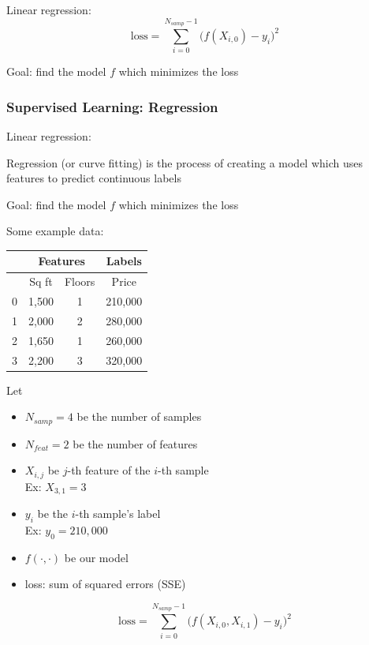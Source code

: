 \documentclass{beamer}
\begin{document}
\begin{frame}
\begin{alertblock}{Linear regression:}
			\begin{equation*}
				\textrm{loss} = \sum_{i=0}^{N_{samp}-1} \Big( f(X_{i,0}) - y_i \Big)^2
			\end{equation*}
			
			\vspace{10pt}
			Goal: find the model $f$ which minimizes the loss
		\endminipage\hfill
	\end{alertblock}

\end{frame}

\begin{frame}
	\frametitle{Supervised Learning: Regression}
	
	\begin{alertblock}{Linear regression:}
		\footnotesize
		
			Regression (or curve fitting) is the process of creating a model which uses features to predict continuous labels
		
			\vspace{10pt}
			Goal: find the model $f$ which minimizes the loss
			
			\vspace{10pt}
			Some example data: \\
			
			\begin{tabular}{|c|c|c|c|}
				\hline
				& \multicolumn{2}{|c|}{Features} & Labels \\
				\hline
				& Sq ft & Floors & Price \\
				\hline
				0 & 1,500 & 1 & 210,000 \\
				\hline
				1 & 2,000 & 2 & 280,000 \\
				\hline
				2 & 1,650 & 1 & 260,000 \\
				\hline
				3 & 2,200 & 3 & 320,000 \\
				\hline
			\end{tabular}
		\endminipage\hfill
		\endminipage\hfill
			Let
			\begin{itemize}
				\item $N_{samp}=4$ be the number of samples
				\item $N_{feat}=2$ be the number of features
				\item $X_{i,j}$ be $j$-th feature of the $i$-th sample \\
				Ex: $X_{3,1} = 3$
				\item $y_i$ be the $i$-th sample's label \\
				Ex: $y_{0} = 210,000$
				\item $f(\cdot,\cdot)$ be our model
				\item loss: sum of squared errors (SSE)
			\end{itemize}
			
			\begin{equation*}
				\textrm{loss} = \sum_{i=0}^{N_{samp}-1} \Big( f(X_{i,0},X_{i,1}) - y_i \Big)^2
			\end{equation*}
		\endminipage\hfill
	\end{alertblock}

\end{frame}
\end{document}
